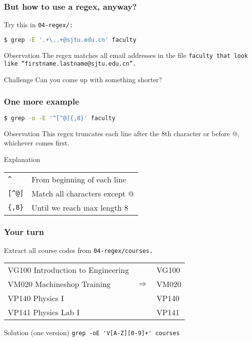 \begin{frame}[fragile]
\frametitle{But how to use a regex, anyway?}
Try this in \tt{04-regex/}:
\begin{lstlisting}[language=bash]
$ grep -E '.+\..+@sjtu.edu.cn' faculty
\end{lstlisting}
\pause
\begin{block}{Observation}
    The regex matches all email addresses in the file \tt{faculty}
    that look like ``firstname.lastname@sjtu.edu.cn''.
\end{block}
\begin{block}{Challenge}
    Can you come up with something shorter?
\end{block}
\end{frame}

\begin{frame}[fragile]
\frametitle{One more example}
\begin{lstlisting}[language=bash]
$ grep -o -E '^[^@]{,8}' faculty
\end{lstlisting}
\pause
\begin{block}{Observation}
    This regex truncates each line after the 8th character or before @,
    whichever comes first.
\end{block}
\begin{block}{Explanation}
    \begin{tabular}{ll}
        \verb|^|    & From beginning of each line \\
        \verb|[^@]| & Match all characters except @ \\
        \verb|{,8}| & Until we reach max length 8
    \end{tabular}
\end{block}
\end{frame}

\begin{frame}[fragile]
\frametitle{Your turn}
Extract all course codes from \tt{04-regex/courses}. \newline

\begin{tabular}{lcl}
    VG100 Introduction to Engineering & & VG100 \\
    VM020 Machineshop Training & $\Longrightarrow$ & VM020 \\
    VP140 Physics I & & VP140 \\
    VP141 Physics Lab I & & VP141
\end{tabular}
\pause
\begin{block}{Solution (one version)}
    \verb|grep -oE 'V[A-Z][0-9]+' courses|
\end{block}
\end{frame}

